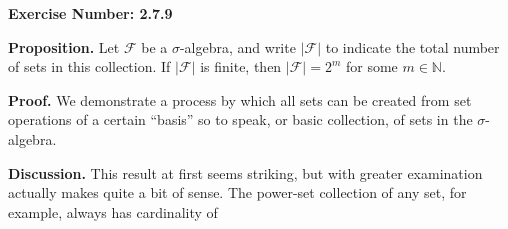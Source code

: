\documentclass{article}
\begin{document}
\noindent \textbf{Exercise Number: 2.7.9}  %

\medskip 

\noindent \textbf{Proposition.} Let $\mathcal{F}$ be a $\sigma$-algebra, and write $|\mathcal{F}|$ to indicate the total number of sets in this collection. If $|\mathcal{F}|$ is finite, then $|\mathcal{F}| = 2^m$ for some $m \in \mathbb{N}$. 

\bigskip

\noindent \textbf{Proof.} We demonstrate a process by which all sets can be created from set operations of a certain ``basis'' so to speak, or basic collection, of sets in the $\sigma$-algebra. 

\bigskip

\noindent \textbf{Discussion.} This result at first seems striking, but with greater examination actually makes quite a bit of sense. The power-set collection of any set, for example, always has cardinality of 
\end{document}
